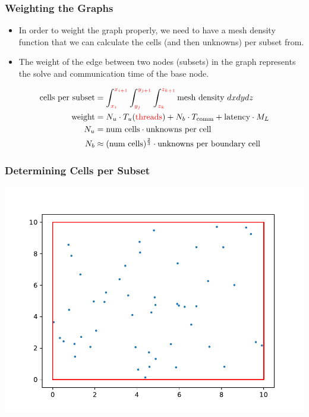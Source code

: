 \documentclass[xcolor={usenames,dvipsnames,svgnames,table}]{beamer}
\newcommand{\tcr}[1]{\textcolor{red}{#1}}
\begin{document}
\begin{frame}[t]\frametitle{Weighting the Graphs}
\begin{block}{}
\begin{itemize}
	\item In order to weight the graph properly, we need to have a mesh density function that we can calculate the cells (and then unknowns) per subset from.
	\item The weight of the edge between two nodes (subsets) in the graph represents the solve and communication time of the base node.
\end{itemize}
\end{block}
\begin{block}{}
\begin{align}
\text{cells per subset} &= \int_{\tcr{x_i}}^{\tcr{x_{i+1}}} \int_{\tcr{y_j}}^{\tcr{y_{j+1}}} \int_{\tcr{z_k}}^{\tcr{z_{k+1}}} \text{mesh density } dx dy dz \\
\label{weight}
\text{weight} &= N_u\cdot T_u (\text{\textcolor{red}{threads}}) + N_b\cdot T_{\text{comm}} + \text{latency}\cdot M_L \\
N_u &= \text{num cells}\cdot \text{unknowns per cell} \\
N_b &\approx(\text{num cells})^{\frac{2}{3}}\cdot \text{unknowns per boundary cell}
\end{align}
\end{block}
\end{frame}

\begin{frame}[t]\frametitle{Determining Cells per Subset}
	\centering
	\includegraphics[scale=0.65]{figures/mesh_points.pdf}
\end{frame}
\end{document}
